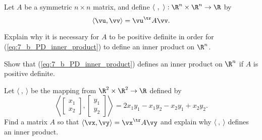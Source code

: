 \begin{activity} Let $A$ be a symmetric $n \times n$ matrix, and define $\langle \ , \ \rangle : \R^n \times \R^n \to \R$ by
    \begin{equation} \label{eq:7_b_PD_inner_product}
    \langle \vu, \vv \rangle = \vu^{\tr}A\vv.
    \end{equation}
    \ba
    \item Explain why it is necessary for $A$ to be positive definite in order for (\ref{eq:7_b_PD_inner_product}) to define an inner product on $\R^n$.

    \item Show that (\ref{eq:7_b_PD_inner_product}) defines an inner product on $\R^n$ if $A$ is positive definite.

	\item Let $\langle \ , \ \rangle$ be the mapping from $\R^2\times \R^2\to \R$ defined by
\[\left\langle \left[ \begin{array}{c} x_1 \\ x_2 \end{array} \right], \left[ \begin{array}{c} y_1 \\ y_2 \end{array} \right] \right\rangle = 2x_1y_1 - x_1y_2 - x_2y_1 + x_2y_2.\]
Find a matrix $A$ so that $\langle \vx, \vy \rangle = \vx^{\tr} A \vy$ and explain why $\langle \ , \ \rangle$ defines an inner product. 

    \ea

\end{activity}

\label{sec:pat_exam}

\ExampleIntro

